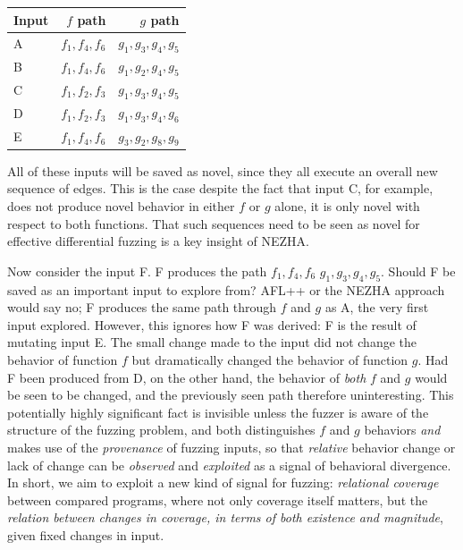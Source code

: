  \begin{tabular}{l|r|r}
   Input & $f$ path & $g$ path\\
   \hline
   A & $f_1, f_4, f_6$ & $g_1, g_3, g_4, g_5$\\
       B & $f_1, f_4, f_6$ & $g_1, g_2, g_4, g_5$\\
           C & $f_1, f_2, f_3$ & $g_1, g_3, g_4, g_5$\\
               D & $f_1, f_2, f_3$ & $g_1, g_3, g_4, g_6$\\
                   E & $f_1, f_4, f_6$ & $g_3, g_2, g_8, g_9$\\
 \end{tabular}

 All of these inputs will be saved as novel, since they all execute an
 overall new sequence of edges.  This is the case despite the fact
 that input C, for example, does not produce novel behavior in either
 $f$ or $g$ alone, it is only novel with respect to both functions.
 That such sequences need to be seen as novel for effective
 differential fuzzing is a key insight of NEZHA.

 Now consider the input F.  F produces the path $f_1, f_4, f_6$ $g_1, g_3, g_4, g_5$.  Should F be saved as an important input to explore
 from?  AFL++ or the NEZHA approach would say no; F produces the same
 path through $f$ and $g$ as A, the very first input explored.
 However, this ignores how F was derived:  F is the result of mutating
 input E.  The small change made to the input did not change the
 behavior of function $f$ but dramatically changed the behavior of
 function $g$.  Had F been produced from D, on the other hand, the
 behavior of \emph{both} $f$ and $g$ would be seen to be changed, and the
 previously seen path therefore uninteresting.  This potentially highly significant fact is invisible
 unless the fuzzer is aware of the structure of the fuzzing problem,
 and both distinguishes $f$ and $g$ behaviors \emph{and} makes use of
 the \emph{provenance} of fuzzing inputs, so that \emph{relative} behavior change or lack
 of change can be \emph{observed} and \emph{exploited} as a signal of
 behavioral divergence.  In short, we aim to exploit a new kind of
 signal for fuzzing: \emph{relational coverage} between compared
 programs, where not only coverage itself matters, but the
 \emph{relation between changes in coverage, in terms of both
   existence and magnitude}, given fixed changes in input.

